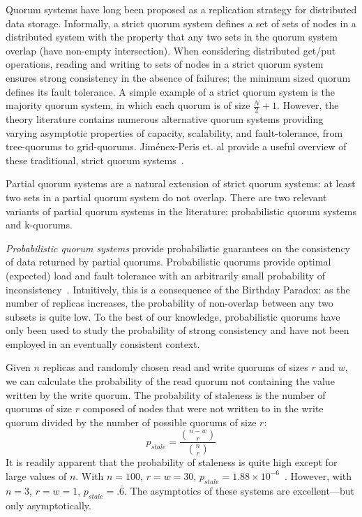 \documentclass{vldb}
\begin{document}
Quorum systems have long been proposed as a replication strategy for
distributed data storage.  Informally, a strict quorum system defines
a set of sets of nodes in a distributed system with the property that
any two sets in the quorum system overlap (have non-empty
intersection).  When considering distributed get/put operations,
reading and writing to sets of nodes in a strict quorum system ensures
strong consistency in the absence of failures; the minimum sized
quorum defines its fault tolerance.  A simple example of a strict
quorum system is the majority quorum system, in which each quorum is
of size $\frac{N}{2}+1$.  However, the theory literature contains
numerous alternative quorum systems providing varying asymptotic
properties of capacity, scalability, and fault-tolerance, from
tree-quorums to grid-quorums.  Jim\'{e}nex-Peris et. al provide a
useful overview of these traditional, strict quorum
systems~\cite{quorums-alternative}.

Partial quorum systems are a natural extension of strict quorum
systems: at least two sets in a partial quorum system do not
overlap.  There are two relevant variants of partial quorum systems in
the literature: probabilistic quorum systems and k-quorums.

\textit{Probabilistic quorum systems} provide probabilistic guarantees
on the consistency of data returned by partial quorums.
Probabilistic quorums provide optimal (expected) load and fault
tolerance with an arbitrarily small probability of
inconsistency~\cite{prob-quorum}.  Intuitively, this is a consequence
of the Birthday Paradox: as the number of replicas increases, the
probability of non-overlap between any two subsets is quite low.  To
the best of our knowledge, probabilistic quorums have only been used
to study the probability of strong consistency and have not been
employed in an eventually consistent context.

Given $n$ replicas and randomly chosen read and write quorums of sizes
$r$ and $w$, we can calculate the probability of the read quorum not
containing the value written by the write quorum.  The probability of
staleness is the number of quorums of size $r$ composed of nodes that
were not written to in the write quorum divided by the number of
possible quorums of size $r$:
\begin{equation}
\label{eq:prob-strict}
p_{stale}=\frac{{n-w \choose r}}{{n \choose r}}
\end{equation}
It is readily apparent that the probability of staleness is quite high
except for large values of $n$.  With $n=100$, $r=w=30$, $p_{stale} =
1.88 \times 10^{-6}$~\cite{nonstrict-availability}.  However, with
$n=3$, $r=w=1$, $p_{stale} = .\overline{6}$.  The asymptotics of these
systems are excellent---but only asymptotically.  
\end{document}
